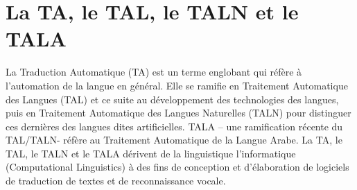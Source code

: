 \documentclass[french]{textolivre}
\begin{document}
\section{La TA, le TAL, le TALN et le TALA}
La Traduction Automatique (TA) est un terme englobant qui réfère à l’automation de la langue en général. Elle se ramifie en Traitement Automatique des Langues (TAL) et ce suite au développement des technologies des langues, puis en Traitement Automatique des Langues Naturelles (TALN) pour distinguer ces dernières des langues dites artificielles. TALA – une ramification récente du TAL/TALN- réfère au Traitement Automatique de la Langue Arabe. La TA, le TAL, le TALN et le TALA dérivent de la linguistique l'informatique (Computational Linguistics) à des fins de conception et d’élaboration de logiciels de traduction de textes et de reconnaissance vocale.
\end{document}
